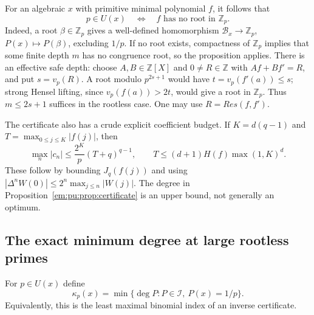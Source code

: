 \documentclass[11pt,a4paper]{article}
\newcommand{\Z}{\mathbb Z}
\theoremstyle{definition}
\theoremstyle{remark}
\theoremstyle{plain}
\numberwithin{equation}{section}
\def\operatorname#1{#1}\def\mathrm#1{#1}}
\begin{document}
For an algebraic $x$ with primitive minimal polynomial $f$, it follows
that
\begin{equation}\label{em:pu:eq:criterion}
 p\in U(x)\quad\Longleftrightarrow\quad
 f\text{ has no root in }\Z_p.
\end{equation}
Indeed, a root $\beta\in\Z_p$ gives a well-defined homomorphism
$\mathcal B_x\to\Z_p$, $P(x)\mapsto P(\beta)$, excluding $1/p$.
If no root exists, compactness of $\Z_p$ implies that some finite
depth $m$ has no congruence root, so the proposition applies.
There is an effective safe depth: choose $A,B\in\Z[X]$ and
$0\ne R\in\Z$ with $Af+Bf'=R$, and put $s=v_p(R)$.
A root modulo $p^{2s+1}$ would have $t=v_p(f'(a))\le s$;
strong Hensel lifting, since $v_p(f(a))>2t$, would give a root
in $\Z_p$.  Thus $m\le2s+1$ suffices in the rootless case.
One may use $R=\operatorname{Res}(f,f')$.

The certificate also has a crude explicit coefficient budget.  If
$K=d(q-1)$ and $T=\max_{0\le j\le K}|f(j)|$, then
\[
 \max_n|c_n|\le\frac{2^K}{p}(T+q)^{q-1},\qquad
 T\le(d+1)H(f)\max(1,K)^d.
\]
These follow by bounding $J_q(f(j))$ and using
$|\Delta^nW(0)|\le2^n\max_{j\le n}|W(j)|$.
The degree in Proposition~\ref{em:pu:prop:certificate} is an upper
bound, not generally an optimum.

\subsection{The exact minimum degree at large rootless primes}

For $p\in U(x)$ define
\[
 \kappa_p(x)=\min\{\deg P:P\in\mathcal I,\ P(x)=1/p\}.
\]
Equivalently, this is the least maximal binomial index of an inverse
certificate.
\end{document}
